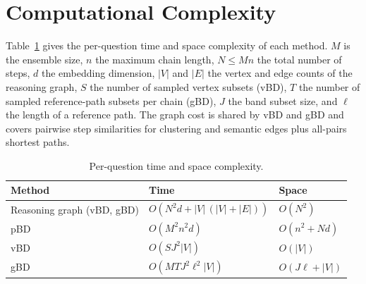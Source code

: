 \documentclass[twoside]{article}
\begin{document}
\section{Computational Complexity}
\label{app:complexity}

Table~\ref{tab:complexity} gives the per-question time and space complexity of each
method. $M$ is the ensemble size, $n$ the maximum chain length, $N \le Mn$ the total
number of steps, $d$ the embedding dimension, $|V|$ and $|E|$ the vertex and edge
counts of the reasoning graph, $S$ the number of sampled vertex subsets (vBD), $T$
the number of sampled reference-path subsets per chain (gBD), $J$ the band subset
size, and $\ell$ the length of a reference path. The graph cost is shared by vBD and
gBD and covers pairwise step similarities for clustering and semantic edges plus
all-pairs shortest paths.

\begin{table}[h]
  \caption{Per-question time and space complexity.}
  \label{tab:complexity}
  \centering
  \small
  \begin{tabular}{lll}
    \toprule
    \textbf{Method} & \textbf{Time} & \textbf{Space} \\
    \midrule
    Reasoning graph (vBD, gBD) & $O(N^2 d + |V|\,(|V| + |E|))$ & $O(N^2)$ \\
    \midrule
    pBD & $O(M^2 n^2 d)$ & $O(n^2 + Nd)$ \\
    vBD & $O(S J^2 |V|)$ & $O(|V|)$ \\
    gBD & $O(M T J^2 \ell^2 |V|)$ & $O(J\ell + |V|)$ \\
    \bottomrule
  \end{tabular}
\end{table}
\end{document}
